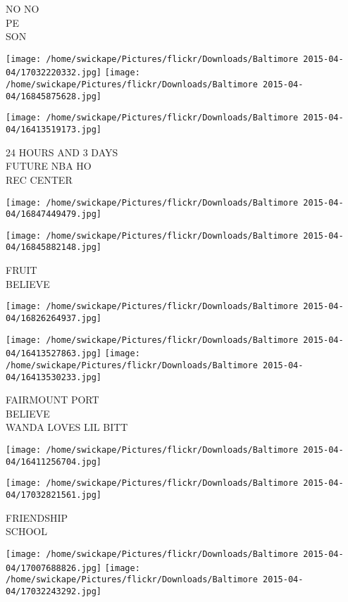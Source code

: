 \documentclass[10pt,letterpaper]{article}
\begin{document}
NO NO\\
PE\\
SON
\pagebreak

\texttt{[image: /home/swickape/Pictures/flickr/Downloads/Baltimore 2015-04-04/17032220332.jpg]}
\texttt{[image: /home/swickape/Pictures/flickr/Downloads/Baltimore 2015-04-04/16845875628.jpg]}

\vspace{0.25in}
\texttt{[image: /home/swickape/Pictures/flickr/Downloads/Baltimore 2015-04-04/16413519173.jpg]}

24 HOURS AND 3 DAYS\\
FUTURE NBA HO\\
REC CENTER
\pagebreak

\texttt{[image: /home/swickape/Pictures/flickr/Downloads/Baltimore 2015-04-04/16847449479.jpg]}

\vspace{0.25in}
\texttt{[image: /home/swickape/Pictures/flickr/Downloads/Baltimore 2015-04-04/16845882148.jpg]}

FRUIT\\
BELIEVE
\pagebreak

\texttt{[image: /home/swickape/Pictures/flickr/Downloads/Baltimore 2015-04-04/16826264937.jpg]}

\vspace{0.25in}
\texttt{[image: /home/swickape/Pictures/flickr/Downloads/Baltimore 2015-04-04/16413527863.jpg]}
\texttt{[image: /home/swickape/Pictures/flickr/Downloads/Baltimore 2015-04-04/16413530233.jpg]}

FAIRMOUNT PORT\\
BELIEVE\\
WANDA LOVES LIL BITT
\pagebreak

\texttt{[image: /home/swickape/Pictures/flickr/Downloads/Baltimore 2015-04-04/16411256704.jpg]}

\vspace{0.25in}
\texttt{[image: /home/swickape/Pictures/flickr/Downloads/Baltimore 2015-04-04/17032821561.jpg]}

FRIENDSHIP\\
SCHOOL
\pagebreak

\texttt{[image: /home/swickape/Pictures/flickr/Downloads/Baltimore 2015-04-04/17007688826.jpg]}
\texttt{[image: /home/swickape/Pictures/flickr/Downloads/Baltimore 2015-04-04/17032243292.jpg]}
\end{document}
